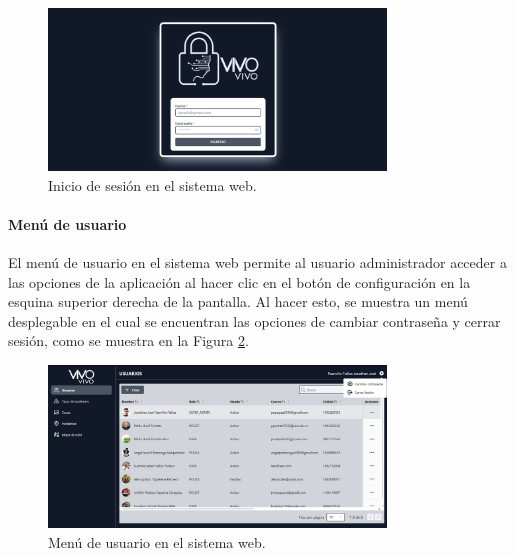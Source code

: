\begin{figure}[H]
    \centering
    \includegraphics[width=0.8\textwidth]{chapters/III-resultados-y-discusion/resources/images/inicio-sesion-web.png}
    \caption{Inicio de sesión en el sistema web.}
    \label{fig:inicio-sesion-web}
\end{figure}

\paragraph{Menú de usuario}
El menú de usuario en el sistema web permite al usuario administrador acceder a las opciones de la aplicación al hacer clic en
el botón de configuración en la esquina superior derecha de la pantalla. Al hacer esto, se muestra un menú desplegable en el
cual se encuentran las opciones de cambiar contraseña y cerrar sesión, como se muestra en la Figura \ref{fig:menu-usuario-web}.

\begin{figure}[H]
    \centering
    \includegraphics[width=0.8\textwidth]{chapters/III-resultados-y-discusion/resources/images/menu-usuario-web.png}
    \caption{Menú de usuario en el sistema web.}
    \label{fig:menu-usuario-web}
\end{figure}

